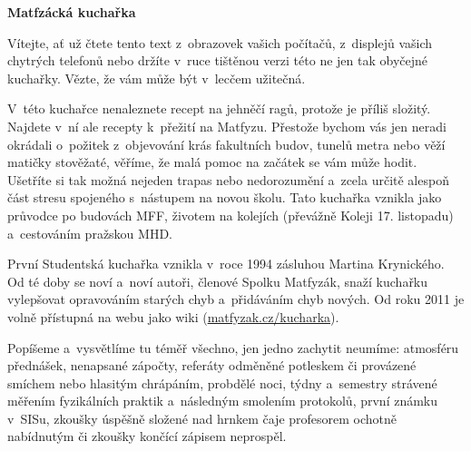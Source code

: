 \begin{center}
\huge{
	\textbf{Matfzácká kuchařka        }
}

\vspace*{1cm}
\end{center}

\noindent Vítejte, ať už čtete tento text z~obrazovek vašich počítačů,
z~displejů vašich chytrých telefonů nebo držíte v~ruce tištěnou verzi této ne
jen tak obyčejné kuchařky. Vězte, že vám může být v~lecčem užitečná.


V~této kuchařce nenaleznete recept na jehněčí ragů, protože je příliš složitý.
Najdete v~ní ale recepty k~přežití na Matfyzu.
Přestože bychom vás jen neradi okrádali o~požitek z~objevování krás
fakultních budov, tunelů metra nebo věží matičky stověžaté, věříme,
že malá pomoc na začátek se vám může hodit.
Ušetříte si tak možná nejeden trapas nebo nedorozumění a~zcela určitě
alespoň část stresu spojeného s~nástupem na novou školu.
Tato kuchařka vznikla jako průvodce po budovách MFF,
životem na kolejích (převážně Koleji 17. listopadu) a~cestováním pražskou MHD.


První Studentská kuchařka vznikla v~roce 1994 zásluhou Martina Krynického.
Od té doby se noví a~noví autoři, členové Spolku Matfyzák,
snaží kuchařku vylepšovat opravováním starých chyb a~přidáváním chyb nových.
Od roku 2011 je volně přístupná na webu jako wiki
(\url{matfyzak.cz/kucharka}).


Popíšeme a~vysvětlíme tu téměř všechno, jen jedno zachytit neumíme:
atmosféru přednášek, nenapsané zápočty, referáty odměněné potleskem
či provázené smíchem nebo hlasitým chrápáním, probdělé noci,
týdny a~semestry strávené měřením fyzikálních praktik a~následným
smolením protokolů, první známku v~SISu, zkoušky úspěšně složené
nad hrnkem čaje profesorem ochotně nabídnutým či zkoušky končící
zápisem neprospěl.